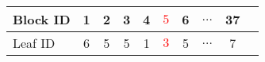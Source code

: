 
\begin{tabular}{ l | *{9}{c} } %
	
		Block ID	& 1	& 2	& 3	& 4	& \textcolor{red}{$5$}	& 6	& $\ldots$	& 37	\\
	
		\midrule%
	
		Leaf ID		& 6	& 5	& 5	& 1	& \textcolor{red}{$3$}	& 5	& $\ldots$	& 7		\\
	
\end{tabular}
